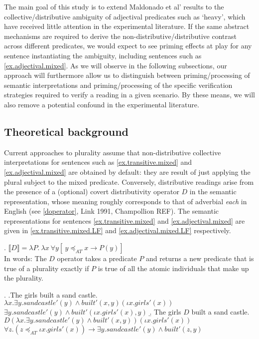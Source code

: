 \documentclass[a4paper, 11pt]{article}
\begin{document}
The main goal of this study is to extend Maldonado et al' results to the collective/distributive ambiguity of adjectival predicates such as `heavy', which have received little attention in the experimental literature. If the same abstract mechanisms are required to derive the non-distributive/distributive contrast across different predicates, we would expect to see priming effects at play for any sentence instantiating the ambiguity, including sentences such as \ref{ex.adjectival.mixed}.
As we will observe in the following subsections, our approach will furthermore allow us to distinguish between priming/processing of semantic interpretations and priming/processing of the specific verification strategies required to verify a reading in a given scenario. By these means, we will also remove a potential confound in the experimental literature. 

\subsection{Theoretical background}
Current approaches to plurality assume that non-distributive collective interpretations for sentences such as \ref{ex.transitive.mixed} and \ref{ex.adjectival.mixed} are obtained by default: they are result of just applying the plural subject to the mixed predicate. 
Conversely, distributive readings arise from the presence of a (optional) covert distributivity operator $D$ in the semantic representation, whose meaning roughly corresponds to that of adverbial \textit{each} in English (see \ref{doperator}, Link 1991, Champollion REF). The semantic representations for sentences  \ref{ex.transitive.mixed} and \ref{ex.adjectival.mixed} are given in \ref{ex.transitive.mixed.LF} and \ref{ex.adjectival.mixed.LF} respectively. 


\ex. \label{doperator} $ \llbracket D \rrbracket = \lambda P.  \ \lambda x \ \forall y[\ y \preceq_{AT} x \rightarrow P(y)]$ \\
In words: The $D$ operator takes a predicate $P$ and returns a new predicate that is true of a plurality exactly if $P$ is true of all the atomic individuals that make up the plurality. 

\ex.  \label{ex.transitive.mixed.LF}
	\a.The girls built a sand castle.\\
    $\lambda x.\exists y.\mathit{sand castle}'(y) \wedge \textit{built}'(x,y)(\iota x.\mathit{girls}'(x))$\\
        $\exists y.\mathit{sandcastle}'(y) \wedge \textit{built}'(\iota x.\mathit{girls}'(x),y)$
        \b. The girls $D$ built a sand castle.\label{ex.transitive.mixed.distributive} \\ 
    $D(\lambda x.\exists y.\mathit{sandcastle}'(y) \wedge \textit{built}'(x,y))(\iota x.\mathit{girls}'(x))$\\
    $\forall z . (z\preceq_{AT}\iota x.\mathit{girls}'(x)) \rightarrow \exists y.\mathit{sand castle}'(y) \wedge \textit{built}'(z,y)$
    
\end{document}
